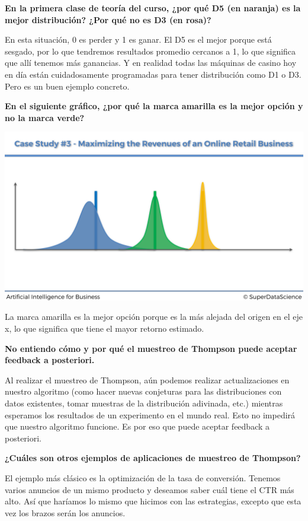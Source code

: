\documentclass[
]{book}
\begin{document}
\textbf{En la primera clase de teoría del curso, ¿por qué D5 (en naranja) es la mejor distribución? ¿Por qué no es D3 (en rosa)?}

En esta situación, 0 es perder y 1 es ganar. El D5 es el mejor porque está sesgado, por lo que tendremos resultados promedio cercanos a 1, lo que significa que allí tenemos más ganancias. Y en realidad todas las máquinas de casino hoy en día están cuidadosamente programadas para tener distribución como D1 o D3. Pero es un buen ejemplo concreto.

\textbf{En el siguiente gráfico, ¿por qué la marca amarilla es la mejor opción y no la marca verde?}

\includegraphics{Images/Beta_Distribution_Slide.png}

La marca amarilla es la mejor opción porque es la más alejada del origen en el eje x, lo que significa que tiene el mayor retorno estimado.

\textbf{No entiendo cómo y por qué el muestreo de Thompson puede aceptar feedback a posteriori.}

Al realizar el muestreo de Thompson, aún podemos realizar actualizaciones en nuestro algoritmo (como hacer nuevas conjeturas para las distribuciones con datos existentes, tomar muestras de la distribución adivinada, etc.) mientras esperamos los resultados de un experimento en el mundo real. Esto no impedirá que nuestro algoritmo funcione. Es por eso que puede aceptar feedback a posteriori.

\textbf{¿Cuáles son otros ejemplos de aplicaciones de muestreo de Thompson?}

El ejemplo más clásico es la optimización de la tasa de conversión. Tenemos varios anuncios de un mismo producto y deseamos saber cuál tiene el CTR más alto. Así que haríamos lo mismo que hicimos con las estrategias, excepto que esta vez los brazos serán los anuncios.
\end{document}
